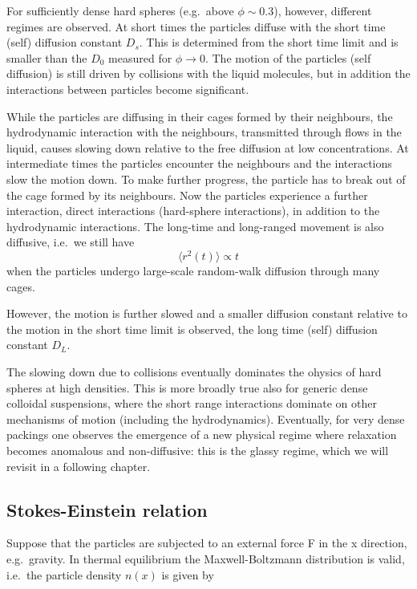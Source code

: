 \documentclass[
  letterpaper,
  enabledeprecatedfontcommands]{report}
\begin{document}
For sufficiently dense hard spheres (e.g.~above \(\phi \sim 0.3\)),
however, different regimes are observed. At short times the particles
diffuse with the short time (self) diffusion constant \(D_{s}\). This is
determined from the short time limit and is smaller than the \(D_{0}\)
measured for \(\phi \rightarrow 0\). The motion of the particles (self
diffusion) is still driven by collisions with the liquid molecules, but
in addition the interactions between particles become significant.

While the particles are diffusing in their cages formed by their
neighbours, the hydrodynamic interaction with the neighbours,
transmitted through flows in the liquid, causes slowing down relative to
the free diffusion at low concentrations. At intermediate times the
particles encounter the neighbours and the interactions slow the motion
down. To make further progress, the particle has to break out of the
cage formed by its neighbours. Now the particles experience a further
interaction, direct interactions (hard-sphere interactions), in addition
to the hydrodynamic interactions. The long-time and long-ranged movement
is also diffusive, i.e.~we still have
\[\langle r^{2}(t)\rangle \propto t\] when the particles undergo
large-scale random-walk diffusion through many cages.

However, the motion is further slowed and a smaller diffusion constant
relative to the motion in the short time limit is observed, the long
time (self) diffusion constant \(D_{L}\).

The slowing down due to collisions eventually dominates the ohysics of
hard spheres at high densities. This is more broadly true also for
generic dense colloidal suspensions, where the short range interactions
dominate on other mechanisms of motion (including the hydrodynamics).
Eventually, for very dense packings one observes the emergence of a new
physical regime where relaxation becomes anomalous and non-diffusive:
this is the glassy regime, which we will revisit in a following chapter.

\subsection{Stokes-Einstein relation}\label{stokes-einstein-relation}

Suppose that the particles are subjected to an external force F in the x
direction, e.g.~gravity. In thermal equilibrium the Maxwell-Boltzmann
distribution is valid, i.e.~the particle density \(n(x)\) is given by
\end{document}
